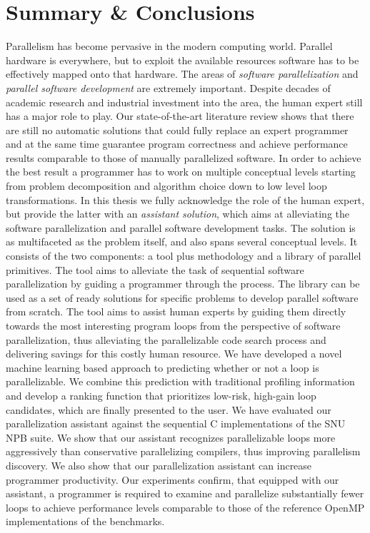 \chapter{Summary \& Conclusions}
\label{conclusion}
\quad Parallelism has become pervasive in the modern computing world. Parallel hardware is everywhere, but to exploit the available resources software has to be effectively mapped onto that hardware. The areas of \textit{software parallelization} and \textit{parallel software development} are extremely important. Despite decades of academic research and industrial investment into the area, the human expert still has a major role to play. Our state-of-the-art literature review shows that there are still no automatic solutions that could fully replace an expert programmer and at the same time guarantee program correctness and achieve performance results comparable to those of manually parallelized software.\newline\null
\quad In order to achieve the best result a programmer has to work on multiple conceptual levels starting from problem decomposition and algorithm choice down to low level loop transformations. In this thesis we fully acknowledge the role of the human expert, but provide the latter with an \textit{assistant solution}, which aims at alleviating the software parallelization and parallel software development tasks. The solution is as multifaceted as the problem itself, and also spans several conceptual levels. It consists of the two components: a tool plus methodology and a library of parallel primitives. The tool aims to alleviate the task of sequential software parallelization by guiding a programmer through the process. The library can be used as a set of ready solutions for specific problems to develop parallel software from scratch.\newline\null
\quad The tool aims to assist human experts by guiding them directly towards the most interesting program loops from the perspective of software parallelization, thus alleviating the parallelizable code search process and delivering savings for this costly human resource. We have developed a novel machine learning based approach to predicting whether or not a loop is parallelizable. We combine this prediction with traditional profiling information and develop a ranking function that prioritizes low-risk, high-gain loop candidates, which are finally presented to the user.\newline\null
\quad We have evaluated our parallelization assistant against the sequential C implementations of the SNU NPB suite. We show that our assistant recognizes parallelizable loops more aggressively than conservative parallelizing compilers, thus improving parallelism discovery. We also show that our parallelization assistant can increase programmer productivity. Our experiments confirm, that equipped with our assistant, a programmer is required to examine and parallelize substantially fewer loops to achieve performance levels comparable to those of the reference OpenMP implementations of the benchmarks.\newline\null
